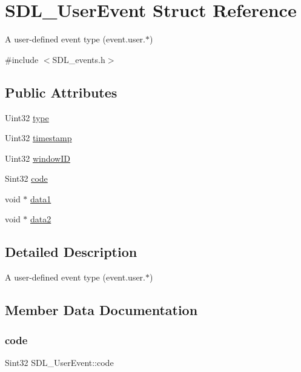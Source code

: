 \hypertarget{struct_s_d_l___user_event}{}\section{S\+D\+L\+\_\+\+User\+Event Struct Reference}
\label{struct_s_d_l___user_event}


A user-\/defined event type (event.\+user.$\ast$)  




{\ttfamily \#include $<$S\+D\+L\+\_\+events.\+h$>$}

\subsection*{Public Attributes}
\begin{DoxyCompactItemize}
\item 
Uint32 \mbox{\hyperlink{struct_s_d_l___user_event_ab7afa8b98dbd7b52bef41155e10f7340}{type}}
\item 
Uint32 \mbox{\hyperlink{struct_s_d_l___user_event_adbf1d34c73138a0c549310e5d4ad0c35}{timestamp}}
\item 
Uint32 \mbox{\hyperlink{struct_s_d_l___user_event_abccefa10e0e0e3a0801bc6d836a08da7}{window\+ID}}
\item 
Sint32 \mbox{\hyperlink{struct_s_d_l___user_event_aef47976781ee82b527a353c5acfa0a34}{code}}
\item 
void $\ast$ \mbox{\hyperlink{struct_s_d_l___user_event_ab2893a12be2f97195f16463a23107913}{data1}}
\item 
void $\ast$ \mbox{\hyperlink{struct_s_d_l___user_event_aae4dbf65c34d654c9edf519eb061b7cf}{data2}}
\end{DoxyCompactItemize}


\subsection{Detailed Description}
A user-\/defined event type (event.\+user.$\ast$) 

\subsection{Member Data Documentation}
\mbox{\label{struct_s_d_l___user_event_aef47976781ee82b527a353c5acfa0a34}} 
\subsubsection{\texorpdfstring{code}{code}}
{\footnotesize\ttfamily Sint32 S\+D\+L\+\_\+\+User\+Event\+::code}

